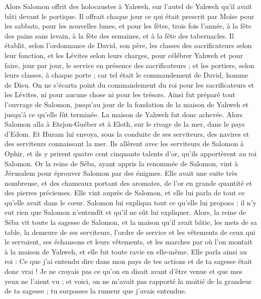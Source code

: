 \begin{multicols}{2}
Alors Salomon offrit des holocaustes à Yahweh, sur l'autel de Yahweh qu'il avait bâti devant le portique.
Il offrait chaque jour ce qui était prescrit par Moïse pour les sabbats, pour les nouvelles lunes, et pour les fêtes, trois fois l'année, à la fête des pains sans levain, à la fête des semaines, et à la fête des tabernacles.
Il établit, selon l'ordonnance de David, son père, les classes des sacrificateurs selon leur fonction, et les Lévites selon leurs charges, pour célébrer Yahweh et pour faire, jour par jour, le service en présence des sacrificateurs ; et les portiers, selon leurs classes, à chaque porte ; car tel était le commandement de David, homme de Dieu.
On ne s'écarta point du commandement du roi pour les sacrificateurs et les Lévites, ni pour aucune chose ni pour les trésors.
Ainsi fut préparé tout l'ouvrage de Salomon, jusqu'au jour de la fondation de la maison de Yahweh et jusqu'à ce qu'elle fût terminée. La maison de Yahweh fut donc achevée.
Alors Salomon alla à Etsjon-Guéber et à Eloth, sur le rivage de la mer, dans le pays d'Edom.
Et Huram lui envoya, sous la conduite de ses serviteurs, des navires et des serviteurs connaissant la mer. Ils allèrent avec les serviteurs de Salomon à Ophir, et ils y prirent quatre cent cinquante talents d'or, qu'ils apportèrent au roi Salomon.
\VerseOne{}Or la reine de Séba, ayant appris la renommée de Salomon, vint à Jérusalem pour éprouver Salomon par des énigmes. Elle avait une suite très nombreuse, et des chameaux portant des aromates, de l'or en grande quantité et des pierres précieuses. Elle vint auprès de Salomon, et elle lui parla de tout ce qu'elle avait dans le cœur.
Salomon lui expliqua tout ce qu'elle lui proposa ; il n'y eut rien que Salomon n'entendît et qu'il ne sût lui expliquer.
Alors, la reine de Séba vit toute la sagesse de Salomon, et la maison qu'il avait bâtie,
les mets de sa table, la demeure de ses serviteurs, l'ordre de service et les vêtements de ceux qui le servaient, ses échansons et leurs vêtements, et les marches par où l'on montait à la maison de Yahweh, et elle fut toute ravie en elle-même.
Elle parla ainsi au roi : Ce que j'ai entendu dire dans mon pays de tes actions et de ta sagesse était donc vrai !
Je ne croyais pas ce qu'on en disait avant d'être venue et que mes yeux ne l'aient vu ; et voici, on ne m'avait pas rapporté la moitié de la grandeur de ta sagesse ; tu surpasses la rumeur que j'avais entendue.

\end{multicols}
